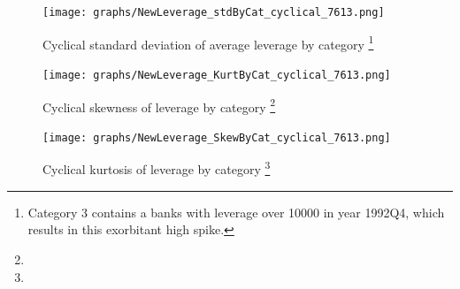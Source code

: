 \documentclass[12pt, a4paper]{article} %
\begin{document}

\begin{figure}[hbtp]
\begin{minipage}{\textwidth}
\centering
\caption[1]{Cyclical standard deviation of average leverage by category \footnote{Category 3 contains a banks with leverage over 10000 in year 1992Q4, which results in this exorbitant high spike.}}
\texttt{[image: graphs/NewLeverage\_stdByCat\_cyclical\_7613.png]}
\label{fig:averageLeverage_cyclicalStd_Categories}
\end{minipage}
\end{figure}


\begin{figure}[hbtp]
\begin{minipage}{\textwidth}
\centering
\caption[1]{Cyclical skewness of leverage by category \footnote{}}
\texttt{[image: graphs/NewLeverage\_KurtByCat\_cyclical\_7613.png]}
\label{fig:averageLeverage_kurt_cyclical_Categories}
\end{minipage}
\end{figure}

\begin{figure}[hbtp]
\begin{minipage}{\textwidth}
\centering
\caption[1]{Cyclical kurtosis of leverage by category \footnote{}}
\texttt{[image: graphs/NewLeverage\_SkewByCat\_cyclical\_7613.png]}
\label{fig:averageLeverage_skew_cyclical_Categories}
\end{minipage}
\end{figure}
\end{document}
